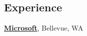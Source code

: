\documentclass[margin,line]{res}
\begin{document}
\begin{resume}
%
%
\section{\sc Experience}
{\bf \href{http://microsoft.com}{Microsoft}}, Bellevue, WA \\
% 
% 
% 
% 

\end{resume}
\end{document}
